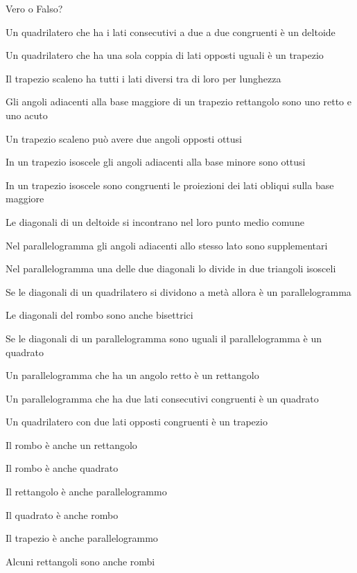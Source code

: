 \begin{esercizio}
\label{ese:4.2}
Vero o Falso?
\begin{enumeratea}
\item Un quadrilatero che ha i lati consecutivi a due a due 
congruenti è un deltoide\hfill\boxV\quad\boxF
\item Un quadrilatero che ha una sola coppia di lati opposti uguali è 
un trapezio\hfill\boxV\quad\boxF
\item Il trapezio scaleno ha tutti i lati diversi tra di loro per 
lunghezza\hfill\boxV\quad\boxF
\item Gli angoli adiacenti alla base maggiore di un trapezio 
rettangolo sono uno retto e uno acuto\hfill\boxV\quad\boxF
\item Un trapezio scaleno può avere due angoli opposti 
ottusi\hfill\boxV\quad\boxF
\item In un trapezio isoscele gli angoli adiacenti alla base minore 
sono ottusi\hfill\boxV\quad\boxF
\item In un trapezio isoscele sono congruenti le proiezioni dei lati 
obliqui sulla base maggiore\tab\hfill\boxV\quad\boxF
\item Le diagonali di un deltoide si incontrano nel loro punto medio 
comune\hfill\boxV\quad\boxF
\item Nel parallelogramma gli angoli adiacenti allo stesso lato sono 
supplementari\hfill\boxV\quad\boxF
\item Nel parallelogramma una delle due diagonali lo divide in due 
triangoli isosceli\tab\tab\tab\hfill\boxV\quad\boxF
\item Se le diagonali di un quadrilatero si dividono a metà allora è 
un parallelogramma\tab\tab\hfill\boxV\quad\boxF
\item Le diagonali del rombo sono anche 
bisettrici\hfill\boxV\quad\boxF
\item Se le diagonali di un parallelogramma sono uguali il 
parallelogramma è un quadrato\tab\tab\hfill\boxV\quad\boxF
\item Un parallelogramma che ha un angolo retto è un 
rettangolo\hfill\boxV\quad\boxF
\item Un parallelogramma che ha due lati consecutivi congruenti è un 
quadrato\hfill\boxV\quad\boxF
\item Un quadrilatero con due lati opposti congruenti è un 
trapezio\hfill\boxV\quad\boxF
\item Il rombo è anche un rettangolo\hfill\boxV\quad\boxF
\item Il rombo è anche quadrato\hfill\boxV\quad\boxF
\item Il rettangolo è anche parallelogrammo\hfill\boxV\quad\boxF
\item Il quadrato è anche rombo\hfill\boxV\quad\boxF
\item Il trapezio è anche parallelogrammo\hfill\boxV\quad\boxF
\item Alcuni rettangoli sono anche rombi\hfill\boxV\quad\boxF
\end{enumeratea}
\end{esercizio}

